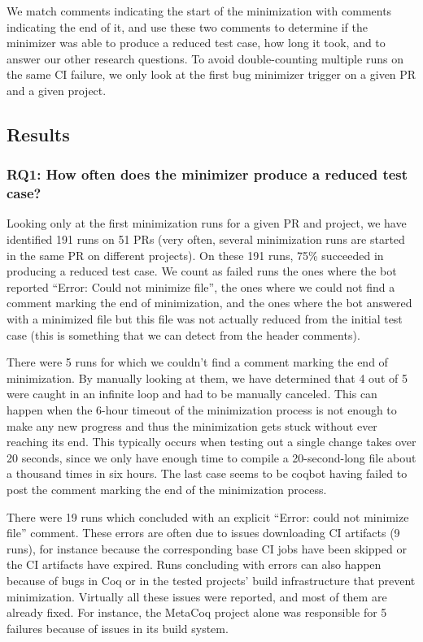 \documentclass[a4paper,USenglish,cleveref,autoref,thm-restate]{lipics-v2021}
\begin{document}
We match comments indicating the start of the minimization with comments indicating the end of it, and use these two comments to determine if the minimizer was able to produce a reduced test case, how long it took, and to answer our other research questions.
To avoid double-counting multiple runs on the same CI failure, we only look at the first bug minimizer trigger on a given PR and a given project.

\subsection{Results}

\subsubsection{RQ1: How often does the minimizer produce a reduced test case?}

Looking only at the first minimization runs for a given PR and project, we have identified 191 runs on 51 PRs (very often, several minimization runs are started in the same PR on different projects).
On these 191 runs, 75\% succeeded in producing a reduced test case. We count as failed runs the ones where the bot reported ``Error: Could not minimize file'', the ones where we could not find a comment marking the end of minimization, and the ones where the bot answered with a minimized file but this file was not actually reduced from the initial test case (this is something that we can detect from the header comments).

There were 5 runs for which we couldn't find a comment marking the end of minimization. By manually looking at them, we have determined that 4 out of 5 were caught in an infinite loop and had to be manually canceled. This can happen when the 6-hour timeout of the minimization process is not enough to make any new progress and thus the minimization gets stuck without ever reaching its end. This typically occurs when testing out a single change takes over 20 seconds, since we only have enough time to compile a 20-second-long file about a thousand times in six hours. The last case seems to be coqbot having failed to post the comment marking the end of the minimization process.

There were 19 runs which concluded with an explicit ``Error: could not minimize file'' comment. These errors are often due to issues downloading CI artifacts (9 runs), for instance because the corresponding base CI jobs have been skipped or the CI artifacts have expired. Runs concluding with errors can also happen because of bugs in Coq or in the tested projects' build infrastructure that prevent minimization. Virtually all these issues were reported, and most of them are already fixed. For instance, the MetaCoq project alone was responsible for 5 failures because of issues in its build system.
\end{document}
